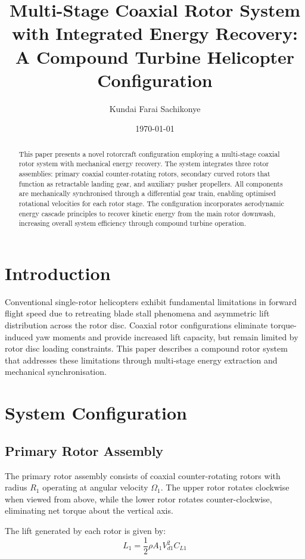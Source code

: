 \documentclass[12pt,a4paper]{article}
\title{Multi-Stage Coaxial Rotor System with Integrated Energy Recovery: A Compound Turbine Helicopter Configuration}
\author{Kundai Farai Sachikonye}
\date{\today}
\begin{document}
\maketitle

\begin{abstract}
This paper presents a novel rotorcraft configuration employing a multi-stage coaxial rotor system with mechanical energy recovery. The system integrates three rotor assemblies: primary coaxial counter-rotating rotors, secondary curved rotors that function as retractable landing gear, and auxiliary pusher propellers. All components are mechanically synchronised through a differential gear train, enabling optimised rotational velocities for each rotor stage. The configuration incorporates aerodynamic energy cascade principles to recover kinetic energy from the main rotor downwash, increasing overall system efficiency through compound turbine operation.
\end{abstract}

\section{Introduction}

Conventional single-rotor helicopters exhibit fundamental limitations in forward flight speed due to retreating blade stall phenomena and asymmetric lift distribution across the rotor disc. Coaxial rotor configurations eliminate torque-induced yaw moments and provide increased lift capacity, but remain limited by rotor disc loading constraints. This paper describes a compound rotor system that addresses these limitations through multi-stage energy extraction and mechanical synchronisation.

\section{System Configuration}

\subsection{Primary Rotor Assembly}

The primary rotor assembly consists of coaxial counter-rotating rotors with radius $R_1$ operating at angular velocity $\Omega_1$. The upper rotor rotates clockwise when viewed from above, while the lower rotor rotates counter-clockwise, eliminating net torque about the vertical axis.

The lift generated by each rotor is given by:
\begin{equation}
L_1 = \frac{1}{2}\rho A_1 V_{d1}^2 C_{L1}
\end{equation}
\end{document}
